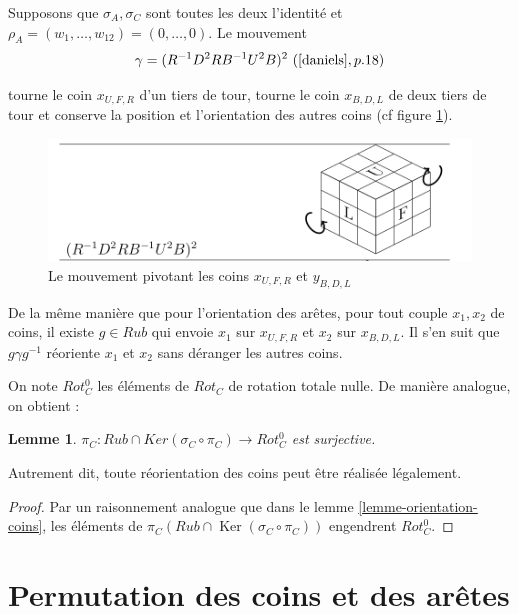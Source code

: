 \documentclass[french]{report}
\newtheorem*{lemma}{Lemme}
\begin{document}
Supposons que $\sigma_A, \sigma_C $ sont toutes les deux l'identité et $\rho_A = (w_1, \dots, w _{12}) = (0, \dots, 0)$. Le mouvement \begin{equation*}
  \gamma = (R ^{-1}  D ^2 RB ^{-1} U ^2 B) ^2 \ (\cite{daniels}, p. 18)
\end{equation*}

tourne le coin $x _{U,F,R}$ d'un tiers de tour, tourne le coin $x _{B,D,L}$ de deux tiers de tour et conserve la position et l'orientation des autres coins (cf figure \ref{pivote_2_coins}).

\begin{figure}[h!]
  \centering
  \includegraphics[scale=0.3]{figures/pivote_2_coins.png}
  \caption{Le mouvement pivotant les coins $x _{U,F,R}$ et $y _{B,D,L}$}
  \label{pivote_2_coins}
\end{figure}


De la même manière que pour l'orientation des arêtes, pour tout couple $x_1, x_2$ de coins, il existe $g \in Rub$ qui envoie $x_1$ sur $x _{U,F,R}$ et $x_2 $ sur $x _{B,D,L}$. Il s'en suit que $g \gamma g ^{-1} $ réoriente $x_1$ et $x_2$ sans déranger les autres coins.

On note $Rot_C ^{0}$ les éléments de $Rot_C$ de rotation totale nulle. De manière analogue, on obtient :

\begin{lemma}
  $\pi_C : Rub \cap Ker(\sigma_C \circ \pi_C) \to Rot_C ^{0}$ est surjective.
\end{lemma}

Autrement dit, toute réorientation des coins peut être réalisée légalement.

\begin{proof}
  Par un raisonnement analogue que dans le lemme \ref{lemme-orientation-coins}, les éléments de $\pi_C(Rub \cap \operatorname{Ker}(\sigma_C \circ \pi_C))$ engendrent $Rot_C ^{0}$.
\end{proof}

\section{Permutation des coins et des arêtes}
\end{document}
